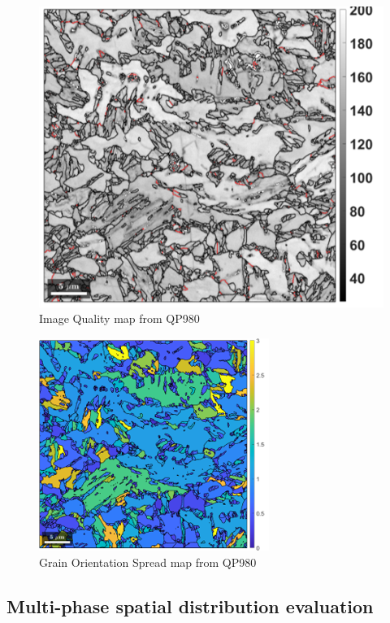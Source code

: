 \begin{figure}
    \centering
    \captionsetup{justification=centering,margin=1cm}
    \includegraphics[width=0.6\linewidth]{Image/IQ QP980.png}
    \caption{Image Quality map from QP980}
    \label{fig:enter-label}
\end{figure}
\begin{figure}
    \centering
    \captionsetup{justification=centering,margin=1cm}
    \includegraphics[width=0.6\linewidth]{Image/GOS QP980.png}
    \caption{Grain Orientation Spread map from QP980}
    \label{fig:enter-label}
\end{figure}


\subsection{Multi-phase spatial distribution evaluation}

